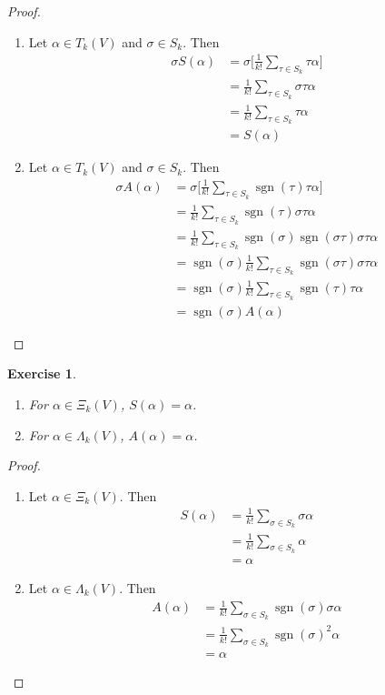 \documentclass[12pt]{amsart}
\newtheorem{ex}[thm]{Exercise}
\newcommand{\al}{\alpha}
\newcommand{\Lam}{\Lambda}
\newcommand{\sig}{\sigma}
\DeclareMathOperator{\sgn}{sgn}
\begin{document}
	\begin{proof}\
		\begin{enumerate}
			\item Let $\al \in T_k(V)$ and $\sig \in S_k$. Then 
			\begin{align*}
				\sig S(\al) 
				&= \sig \bigg[ \frac{1}{k!}\sum_{\tau \in S_k} \tau \al \bigg]\\
				&= \frac{1}{k!} \sum_{\tau \in S_k} \sig \tau \al \\
				&= \frac{1}{k!} \sum_{\tau \in S_k} \tau \al \\
				&= S(\al)
			\end{align*} 
			\item Let $\al \in T_k(V)$ and $\sig \in S_k$. Then 
			\begin{align*}
				\sig A(\al) 
				&= \sig \bigg[ \frac{1}{k!}\sum_{\tau \in S_k} \sgn(\tau)\tau \al \bigg] \\
				&= \frac{1}{k!}\sum_{\tau \in S_k} \sgn(\tau) \sig \tau \al \\
				&= \frac{1}{k!} \sum_{\tau \in S_k} \sgn(\sig) \sgn(\sig \tau) \sig \tau \al \\
				&= \sgn(\sig) \frac{1}{k!} \sum_{\tau \in S_k} \sgn(\sig \tau) \sig \tau \al \\
				&= \sgn(\sig) \frac{1}{k!} \sum_{\tau \in S_k} \sgn(\tau)\tau \al \\
				&= \sgn(\sig)A(\al)
			\end{align*} 
		\end{enumerate}
	\end{proof}

	\begin{ex} \
		\begin{enumerate}
			\item For $\al \in \Xi_k(V)$, $S(\al) = \al$.
			\item For $\al \in \Lam_k(V)$, $A(\al) = \al$.
		\end{enumerate}
	\end{ex}

	\begin{proof}\
		\begin{enumerate}
			\item Let $\al \in \Xi_k(V)$. Then 
			\begin{align*}
				S(\al) 
				&= \frac{1}{k!} \sum_{\sig \in S_k} \sig \al \\
				&= \frac{1}{k!} \sum_{\sig \in S_k} \al \\
				&= \al
			\end{align*}
			\item Let $\al \in \Lam_k(V)$. Then 
			\begin{align*}
				A(\al) 
				&= \frac{1}{k!} \sum_{\sig \in S_k} \sgn(\sig)\sig \al \\
				&= \frac{1}{k!} \sum_{\sig \in S_k} \sgn(\sig)^2 \al \\
				&= \al
			\end{align*}
		\end{enumerate}
	\end{proof}
\end{document}
